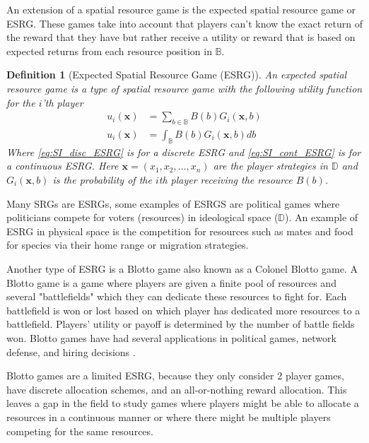 \documentclass{article}
\newtheorem{definition}{Definition}
\newcommand {\D}{\mathbb{D}}
\newcommand {\B}{\mathbb{B}}
\begin{document}
            An extension of a spatial resource game is the expected spatial resource game or ESRG. These games take into account that players can't know the exact return of the reward that they have but rather receive a utility or reward that is based on expected returns from each resource position in $\mathbb{B}$.            \begin{definition}[Expected Spatial Resource Game (ESRG)]
                An expected spatial resource game is a type of spatial resource game with the following utility function for the $i$'th player
                \begin{align}
                    u_{i}(\mathbf{x})&=\sum_{b\in\B} B(b)G_i(\mathbf{x},b) \label{eq:SI_disc_ESRG}\\
                    u_{i}(\mathbf{x})&=\int_{\B} B(b)G_i(\mathbf{x},b)db \label{eq:SI_cont_ESRG}
                \end{align}
                Where \cref{eq:SI_disc_ESRG} is for a discrete ESRG and \cref{eq:SI_cont_ESRG} is for a continuous ESRG. Here $\mathbf{x}=(x_1,x_2,\dots,x_n)$ are the player strategies in $\D$ and $G_i(\mathbf{x},b)$ is the probability of the $i$th player receiving the resource $B(b)$. 
            \end{definition}
            Many SRGs are ESRGs, some examples of ESRGS are political games where politicians compete for voters (resources) in ideological space ($\D$). An example of ESRG in physical space is the competition for resources such as mates and food for species via their home range or migration strategies. 

            Another type of ESRG is a Blotto game also known as a Colonel Blotto game. A Blotto game is a game where players are given a finite pool of resources and several "battlefields" which they can dedicate these resources to fight for. Each battlefield is won or lost based on which player has dedicated more resources to a battlefield. Players' utility or payoff is determined by the number of battle fields won. Blotto games have had several applications in political games, network defense, and hiring decisions \cite{}. 

             Blotto games are a limited ESRG, because they only consider 2 player games, have discrete allocation schemes, and an all-or-nothing reward allocation. This leaves a gap in the field to study games where players might be able to allocate a resources in a continuous manner or where there might be multiple players competing for the same resources. 
\end{document}

